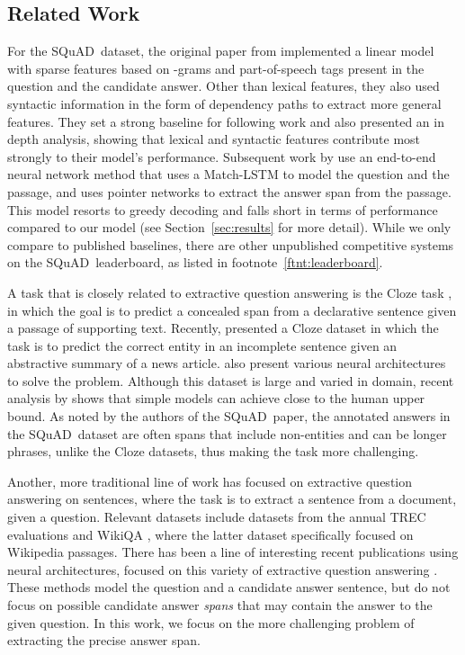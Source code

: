 \documentclass{article} \usepackage{iclr2017_conference,times}
\newcommand{\squad}{{\sc SQuAD}}
\begin{document}
\subsection{Related Work}
For the \squad~dataset, the original paper from \cite{rajpurkar:2016} implemented a linear model with sparse features based on -grams and part-of-speech tags present in the question and the candidate answer.
Other than lexical features, they also used syntactic information in the form of dependency paths to extract more general features.
They set a strong baseline for following work and also presented an in depth analysis, showing that lexical and syntactic features contribute most strongly to their model's performance.  
Subsequent work by \cite{wang2016machine} use an end-to-end neural network method that uses a Match-LSTM to model the question and the passage, and uses pointer networks \citep{vinyals:2015} to extract the answer span from the passage.  
This model resorts to greedy decoding and falls short in terms of performance compared to our model (see Section~\ref{sec:results} for more detail). 
While we only compare to published baselines, there are other unpublished competitive systems on the \squad~leaderboard, as listed in footnote~\ref{ftnt:leaderboard}.

A task that is closely related to extractive question answering is the Cloze task \citep{taylor:1953}, in which the goal is to predict a concealed span from a declarative sentence given a passage of supporting text.
Recently, \cite{hermann2015teaching} presented a Cloze dataset in which the task is to predict the correct entity in an incomplete sentence given an abstractive summary of a news article.  \citeauthor{hermann2015teaching} also present various neural architectures to solve the problem.
Although this dataset is large and varied in domain, recent analysis by \cite{chen2016thorough} shows that simple models can achieve close to the human upper bound.
As noted by the authors of the \squad~paper, the annotated answers in the \squad~dataset are often spans that include non-entities and can be longer phrases, unlike the Cloze datasets, thus making the task more challenging.


Another, more traditional line of work has focused on extractive question answering on sentences, where the task is to extract a sentence from a document, given a question.
Relevant datasets include datasets from the annual TREC evaluations \citep{voorhees:2000} and WikiQA \citep{yang:2015}, where the latter dataset specifically focused on Wikipedia passages.
There has been a line of interesting recent publications using neural architectures, focused on this variety of extractive question answering \citep[\textit{inter alia}]{tymoshenko:2016,wang:2016}.
These methods model the question and a candidate answer sentence, but do not focus on possible candidate answer \textit{spans} that may contain the answer to the given question.
In this work, we focus on the more challenging problem of extracting the precise answer span.
\end{document}
